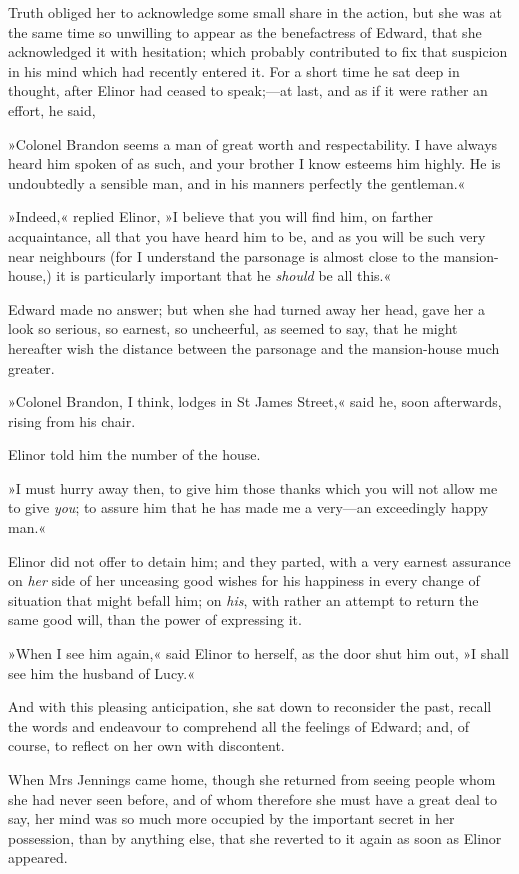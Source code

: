 Truth obliged her to acknowledge some small share in the action, but she was at the same time so unwilling to appear as the benefactress of Edward, that she acknowledged it with hesitation; which probably contributed to fix that suspicion in his mind which had recently entered it. For a short time he sat deep in thought, after Elinor had ceased to speak;—at last, and as if it were rather an effort, he said,

»Colonel Brandon seems a man of great worth and respectability. I have always heard him spoken of as such, and your brother I know esteems him highly. He is undoubtedly a sensible man, and in his manners perfectly the gentleman.«

»Indeed,« replied Elinor, »I believe that you will find him, on farther acquaintance, all that you have heard him to be, and as you will be such very near neighbours (for I understand the parsonage is almost close to the mansion-house,) it is particularly important that he \textit{should} be all this.«

Edward made no answer; but when she had turned away her head, gave her a look so serious, so earnest, so uncheerful, as seemed to say, that he might hereafter wish the distance between the parsonage and the mansion-house much greater.

»Colonel Brandon, I think, lodges in St James Street,« said he, soon afterwards, rising from his chair.

Elinor told him the number of the house.

»I must hurry away then, to give him those thanks which you will not allow me to give \textit{you}; to assure him that he has made me a very—an exceedingly happy man.«

Elinor did not offer to detain him; and they parted, with a very earnest assurance on \textit{her} side of her unceasing good wishes for his happiness in every change of situation that might befall him; on \textit{his}, with rather an attempt to return the same good will, than the power of expressing it.

»When I see him again,« said Elinor to herself, as the door shut him out, »I shall see him the husband of Lucy.«

And with this pleasing anticipation, she sat down to reconsider the past, recall the words and endeavour to comprehend all the feelings of Edward; and, of course, to reflect on her own with discontent.

When Mrs Jennings came home, though she returned from seeing people whom she had never seen before, and of whom therefore she must have a great deal to say, her mind was so much more occupied by the important secret in her possession, than by anything else, that she reverted to it again as soon as Elinor appeared.

